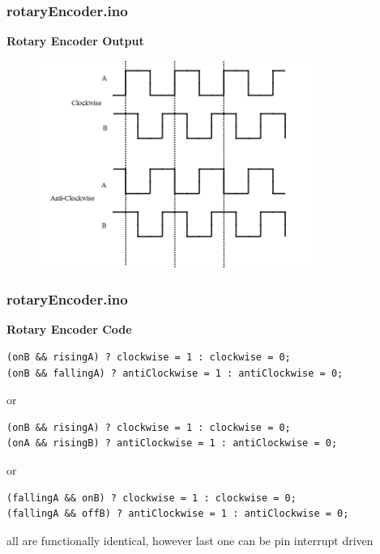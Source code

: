 \documentclass[t]{beamer}
\begin{document}
\begin{frame}[t]
\frametitle{rotaryEncoder.ino}
\textbf{Rotary Encoder Output}

\begin{figure}
	\includegraphics[width=0.8\textwidth]{rotary-encoder-output.jpg}
\end{figure}


\end{frame}


\begin{frame}[t,fragile]
\frametitle{rotaryEncoder.ino}
\textbf{Rotary Encoder Code}

\begin{verbatim}
(onB && risingA) ? clockwise = 1 : clockwise = 0;
(onB && fallingA) ? antiClockwise = 1 : antiClockwise = 0;
\end{verbatim}
or
\begin{verbatim}
(onB && risingA) ? clockwise = 1 : clockwise = 0;
(onA && risingB) ? antiClockwise = 1 : antiClockwise = 0;
\end{verbatim}
or
\begin{verbatim}
(fallingA && onB) ? clockwise = 1 : clockwise = 0;
(fallingA && offB) ? antiClockwise = 1 : antiClockwise = 0;
\end{verbatim}

all are functionally identical, however last one can be pin interrupt driven


\end{frame}

\end{document}
